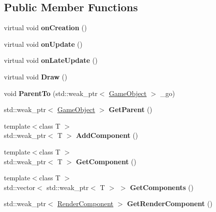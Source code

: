 \subsection*{Public Member Functions}
\begin{DoxyCompactItemize}
\item 
\mbox{\label{class_indigo_1_1_game_object_a932397dbbf6483a7176ba3e1fce4f44e}} 
virtual void {\bfseries on\+Creation} ()
\item 
\mbox{\label{class_indigo_1_1_game_object_acd745af3ff2b0e66f812106eb7c4a723}} 
virtual void {\bfseries on\+Update} ()
\item 
\mbox{\label{class_indigo_1_1_game_object_a4cc2ef646c905807df696c5f23ce8d86}} 
virtual void {\bfseries on\+Late\+Update} ()
\item 
\mbox{\label{class_indigo_1_1_game_object_a3c6beac479284b63adf0ee008e5441fa}} 
virtual void {\bfseries Draw} ()
\item 
\mbox{\label{class_indigo_1_1_game_object_ae2c7042e5f1617f8ae183415d37c109c}} 
void {\bfseries Parent\+To} (std\+::weak\+\_\+ptr$<$ \hyperlink{class_indigo_1_1_game_object}{Game\+Object} $>$ \+\_\+go)
\item 
\mbox{\label{class_indigo_1_1_game_object_a829a4d75c3ec3ab8d997e004f19ecd75}} 
std\+::weak\+\_\+ptr$<$ \hyperlink{class_indigo_1_1_game_object}{Game\+Object} $>$ {\bfseries Get\+Parent} ()
\item 
\mbox{\label{class_indigo_1_1_game_object_ac2716d3d4c2689b075205cd997966557}} 
{\footnotesize template$<$class T $>$ }\\std\+::weak\+\_\+ptr$<$ T $>$ {\bfseries Add\+Component} ()
\item 
\mbox{\label{class_indigo_1_1_game_object_a1cfc6522b37a89a1934a687fa9b4edf2}} 
{\footnotesize template$<$class T $>$ }\\std\+::weak\+\_\+ptr$<$ T $>$ {\bfseries Get\+Component} ()
\item 
\mbox{\label{class_indigo_1_1_game_object_a273065f64485474261b8ddffed244bd0}} 
{\footnotesize template$<$class T $>$ }\\std\+::vector$<$ std\+::weak\+\_\+ptr$<$ T $>$ $>$ {\bfseries Get\+Components} ()
\item 
\mbox{\label{class_indigo_1_1_game_object_a61c8e0889c22ecf118a7e59daac4002e}} 
std\+::weak\+\_\+ptr$<$ \hyperlink{class_indigo_1_1_render_component}{Render\+Component} $>$ {\bfseries Get\+Render\+Component} ()
\end{DoxyCompactItemize}
